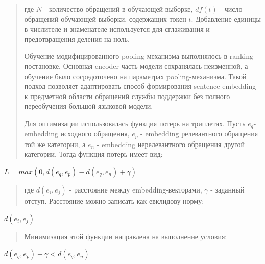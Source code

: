 \documentclass[
]{article}
\begin{document}
\begin{quote}
где \(N\) - количество обращений в обучающей выборке, \(df(t)\) - число
обращений обучающей выборки, содержащих токен \(t\). Добавление единицы
в числителе и знаменателе используется для сглаживания и предотвращения
деления на ноль.

Обучение модифицированного pooling-механизма выполнялось в
ranking-постановке. Основная encoder-часть модели сохранялась
неизменной, а обучение было сосредоточено на параметрах
pooling-механизма. Такой подход позволяет адаптировать способ
формирования sentence embedding к предметной области обращений службы
поддержки без полного переобучения большой языковой модели.

Для оптимизации использовалась функция потерь на триплетах. Пусть
\(e_{q}\)- embedding исходного обращения, \(e_{p}\) - embedding
релевантного обращения той же категории, а \(e_{n}\) - embedding
нерелевантного обращения другой категории. Тогда функция потерь имеет
вид:
\end{quote}

\(L = max\left( 0,d\left( e_{q},e_{p} \right) - d\left( e_{q},e_{n} \right) + \gamma \right)\)

\begin{quote}
где \(d\left( e_{i},e_{j} \right)\) - расстояние между
embedding-векторами, \(\gamma\) - заданный отступ. Расстояние можно
записать как евклидову норму:
\end{quote}

\(d\left( e_{i},e_{j} \right) =\)

\begin{quote}
Минимизация этой функции направлена на выполнение условия:
\end{quote}

\(d\left( e_{q},e_{p} \right) + \gamma < d\left( e_{q},e_{n} \right)\)
\end{document}
